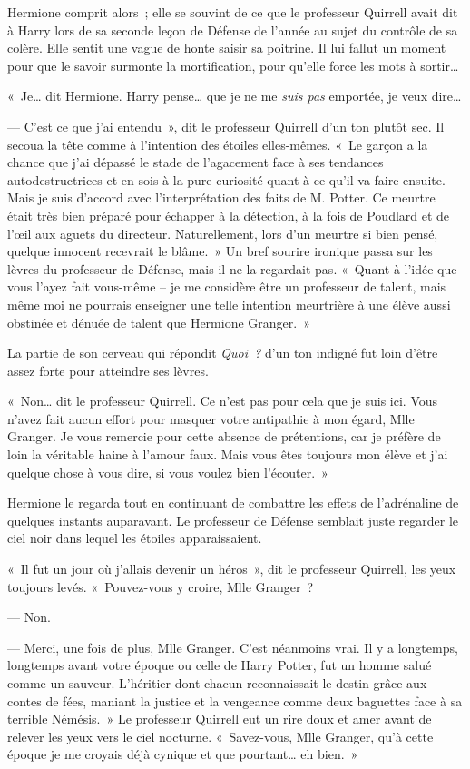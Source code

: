 Hermione comprit alors~; elle se souvint de ce que le professeur Quirrell avait dit à Harry lors de sa seconde leçon de Défense de l'année au sujet du contrôle de sa colère. Elle sentit une vague de honte saisir sa poitrine. Il lui fallut un moment pour que le savoir surmonte la mortification, pour qu'elle force les mots à sortir…

«~Je… dit Hermione. Harry pense… que je ne me \emph{suis pas} emportée, je veux dire…

--- C'est ce que j'ai entendu~», dit le professeur Quirrell d'un ton plutôt sec. Il secoua la tête comme à l'intention des étoiles elles-mêmes. «~Le garçon a la chance que j'ai dépassé le stade de l'agacement face à ses tendances autodestructrices et en sois à la pure curiosité quant à ce qu'il va faire ensuite. Mais je suis d'accord avec l'interprétation des faits de M. Potter. Ce meurtre était très bien préparé pour échapper à la détection, à la fois de Poudlard et de l'œil aux aguets du directeur. Naturellement, lors d'un meurtre si bien pensé, quelque innocent recevrait le blâme.~» Un bref sourire ironique passa sur les lèvres du professeur de Défense, mais il ne la regardait pas. «~Quant à l'idée que vous l'ayez fait vous-même -- je me considère être un professeur de talent, mais même moi ne pourrais enseigner une telle intention meurtrière à une élève aussi obstinée et dénuée de talent que Hermione Granger.~»

La partie de son cerveau qui répondit \emph{Quoi~?} d'un ton indigné fut loin d'être assez forte pour atteindre ses lèvres.

«~Non… dit le professeur Quirrell. Ce n'est pas pour cela que je suis ici. Vous n'avez fait aucun effort pour masquer votre antipathie à mon égard, Mlle Granger. Je vous remercie pour cette absence de prétentions, car je préfère de loin la véritable haine à l'amour faux. Mais vous êtes toujours mon élève et j'ai quelque chose à vous dire, si vous voulez bien l'écouter.~»

Hermione le regarda tout en continuant de combattre les effets de l'adrénaline de quelques instants auparavant. Le professeur de Défense semblait juste regarder le ciel noir dans lequel les étoiles apparaissaient.

«~Il fut un jour où j'allais devenir un héros~», dit le professeur Quirrell, les yeux toujours levés. «~Pouvez-vous y croire, Mlle Granger~?

--- Non.

--- Merci, une fois de plus, Mlle Granger. C'est néanmoins vrai. Il y a longtemps, longtemps avant votre époque ou celle de Harry Potter, fut un homme salué comme un sauveur. L'héritier dont chacun reconnaissait le destin grâce aux contes de fées, maniant la justice et la vengeance comme deux baguettes face à sa terrible Némésis.~» Le professeur Quirrell eut un rire doux et amer avant de relever les yeux vers le ciel nocturne. «~Savez-vous, Mlle Granger, qu'à cette époque je me croyais déjà cynique et que pourtant… eh bien.~»

